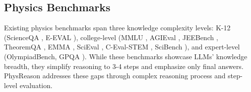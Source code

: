 \subsection{Physics Benchmarks}
Existing physics benchmarks span three knowledge complexity levels: K-12 (ScienceQA \cite{lu2022learn}, E-EVAL \cite{hou-etal-2024-e}), college-level (MMLU \cite{hendrycksmeasuring}, AGIEval \cite{zhong2024agieval}, JEEBench \cite{arora2023have}, TheoremQA \cite{chen2023theoremqa}, EMMA \cite{hao2025can}, SciEval \cite{sun2024scieval}, C-Eval-STEM \cite{huang2024c}, SciBench \cite{wangscibench}), and expert-level (OlympiadBench\cite{he-etal-2024-olympiadbench}, GPQA \cite{rein2024gpqa}).
While these benchmarks showcase LLMs' knowledge breadth, they simplify reasoning to 3-4 steps and emphasize only final answers.
PhysReason addresses these gaps through complex reasoning process and step-level evaluation.
